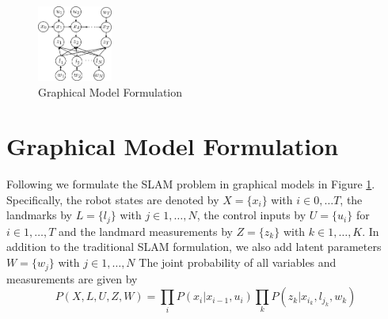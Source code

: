 \begin{figure}
\begin{center}
 \includegraphics[width=0.22\textwidth]{fig/model} 
\end{center}
\caption{Graphical Model Formulation}
\label{fig:model}
\end{figure}

\section{Graphical Model Formulation}
Following \cite{isam} we formulate the SLAM problem in graphical models in Figure \ref{fig:model}. Specifically, the robot states are denoted by $X = \{x_i\}$ with $i \in 0, \dots T$, the landmarks by $L = \{l_j\}$ with $j \in 1,\dots, N$, the control inputs by $U = \{u_i\}$ for $i \in 1,\dots, T$ and the landmard measurements by $Z = \{z_k\}$ with $k \in 1, \dots, K$. In addition to the traditional SLAM formulation, we also add latent parameters $W = \{w_j\}$ with $j \in 1, \dots, N$  The joint probability of all variables and measurements are given by
\begin{equation}
P(X, L, U, Z, W) = \prod\limits_{i}P(x_i|x_{i-1}, u_i)\prod\limits_{k}P(z_k|x_{i_k}, l_{j_k}, w_k)
\label{eq:jointProb}
\end{equation}


